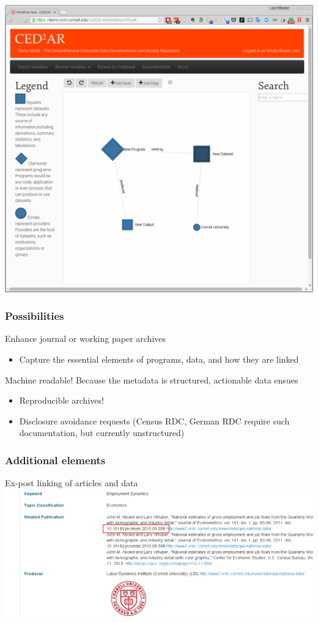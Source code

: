 \begin{frame}
\centering		
		\includegraphics[height=\textheight]{Selection_132}
\end{frame}

\begin{frame}
	\frametitle{Possibilities}
	\begin{block}{Enhance journal or working paper archives}
		\begin{itemize}
			\item Capture the essential elements of programs, data, and how they are linked
		\end{itemize}
	\end{block}
	\begin{block}{Machine readable!}
	Because the metadata is structured, actionable data ensues
	\begin{itemize}
		\item Reproducible archives!
		\item Disclosure avoidance requests (Census RDC, German RDC require such documentation, but currently unstructured)
	\end{itemize}
	\end{block}
\end{frame}

\begin{frame}
	\frametitle{Additional elements}
	\begin{block}{Ex-post linking of articles and data}
		\centering
\includegraphics[scale=0.3]{Selection_129_hilight}
	\end{block}
\end{frame}

